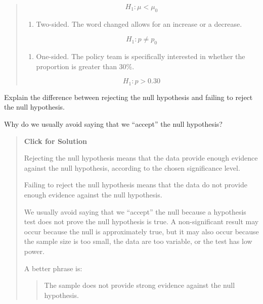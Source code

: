 \documentclass[
  letterpaper,
  DIV=11,
  numbers=noendperiod]{scrreprt}
\providecommand{\tightlist}{%
  \setlength{\itemsep}{0pt}\setlength{\parskip}{0pt}}
\begin{document}
\begin{tcolorbox}
\begin{quote}
\[
H_1: \mu < \mu_0
\]

\begin{enumerate}
\def\labelenumi{\alph{enumi}.}
\setcounter{enumi}{2}
\tightlist
\item
  Two-sided. The word changed allows for an increase or a decrease.
\end{enumerate}

\[
H_1: p \neq p_0
\]

\begin{enumerate}
\def\labelenumi{\alph{enumi}.}
\setcounter{enumi}{3}
\tightlist
\item
  One-sided. The policy team is specifically interested in whether the
  proportion is greater than 30\%.
\end{enumerate}

\[
H_1: p > 0.30
\]
\end{quote}

\end{tcolorbox}

\begin{tcolorbox}[enhanced jigsaw, arc=.35mm, bottomrule=.15mm, bottomtitle=1mm, breakable, colback=white, colbacktitle=quarto-callout-note-color!10!white, colframe=quarto-callout-note-color-frame, coltitle=black, left=2mm, leftrule=.75mm, opacityback=0, opacitybacktitle=0.6, rightrule=.15mm, title=\textcolor{quarto-callout-note-color}{\faInfo}\hspace{0.5em}{Question 4}, titlerule=0mm, toprule=.15mm, toptitle=1mm]

Explain the difference between rejecting the null hypothesis and failing
to reject the null hypothesis.

Why do we usually avoid saying that we ``accept'' the null hypothesis?

\begin{quote}
\textbf{Click for Solution}

Rejecting the null hypothesis means that the data provide enough
evidence against the null hypothesis, according to the chosen
significance level.

Failing to reject the null hypothesis means that the data do not provide
enough evidence against the null hypothesis.

We usually avoid saying that we ``accept'' the null because a hypothesis
test does not prove the null hypothesis is true. A non-significant
result may occur because the null is approximately true, but it may also
occur because the sample size is too small, the data are too variable,
or the test has low power.

A better phrase is:

\begin{quote}
The sample does not provide strong evidence against the null hypothesis.
\end{quote}
\end{quote}

\end{tcolorbox}
\end{document}
